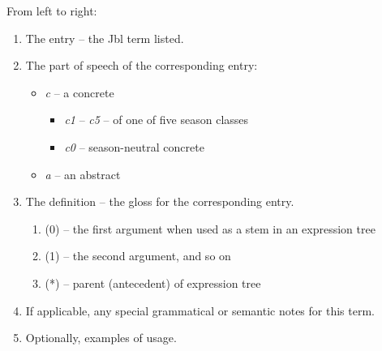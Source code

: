 \documentclass{book}
\newcommand{\lname}{Jbl}
\begin{document}
From left to right:

\begin{enumerate}
    \item The entry -- the \lname{} term listed.
    \item The part of speech of the corresponding entry:
    \begin{itemize}
        \item \textit{c} -- a concrete
        \begin{itemize}
            \item \textit{c1} -- \textit{c5} -- of one of five season classes
            \item \textit{c0} -- season-neutral concrete
        \end{itemize}
        \item \textit{a} -- an abstract
    \end{itemize}
    \item The definition -- the gloss for the corresponding entry.
    \begin{enumerate}
        \item (0) -- the first argument when used as a stem in an expression tree
        \item (1) -- the second argument, and so on
        \item (*) -- parent (antecedent) of expression tree
    \end{enumerate}
    \item If applicable, any special grammatical or semantic notes for this term.
    \item Optionally, examples of usage.
\end{enumerate}

\begin{multicols}{2}
    
\end{multicols}
\end{document}
